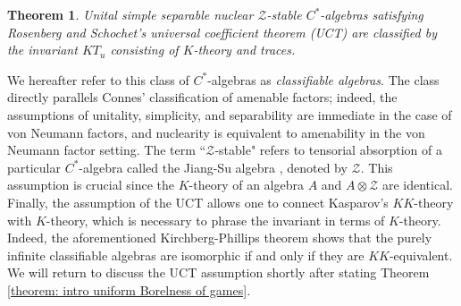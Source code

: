 \documentclass[12pt]{amsart}
\newtheorem{theorem}{Theorem}[section]
\newcommand{\cZ}{\mathcal{Z}}
\begin{document}
\begin{theorem}\label{intro thm: classification of C*-algebras}
Unital simple separable nuclear $\cZ$-stable $C^*$-algebras satisfying Rosenberg and Schochet’s universal coefficient theorem (UCT) are classified by the invariant $KT_u$ consisting of $K$-theory and traces.
\end{theorem}

We hereafter refer to this class of $C^*$-algebras as \textit{classifiable algebras}. The class directly parallels Connes' classification of amenable factors; indeed, the assumptions of unitality, simplicity, and separability are immediate in the case of von Neumann factors, and nuclearity is equivalent to amenability in the von Neumann factor setting.
The term ``$\cZ$-stable" refers to tensorial absorption of a particular $C^*$-algebra called the Jiang-Su algebra \cite{MR1680321}, denoted by $\cZ$.
This assumption is crucial since the $K$-theory of an algebra $A$ and $A \otimes \cZ$ are identical. 
Finally, the assumption of the UCT allows one to connect Kasparov's $KK$-theory \cite{Kasparov1981-origKK} with $K$-theory, which is necessary to phrase the invariant in terms of $K$-theory. 
Indeed, the aforementioned Kirchberg-Phillips theorem shows that the purely infinite classifiable algebras are isomorphic if and only if they are $KK$-equivalent. 
We will return to discuss the UCT assumption shortly after stating Theorem \ref{theorem: intro uniform Borelness of games}.
\\
\end{document}
